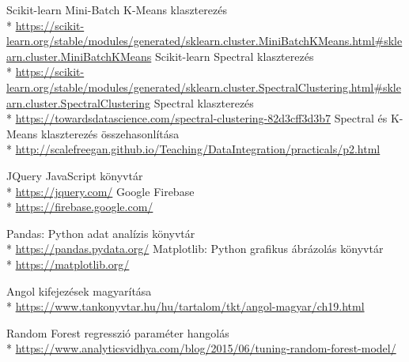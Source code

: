 \begin{thebibliography}{x}
 Scikit-learn Mini-Batch K-Means klaszterezés\\*
\url{https://scikit-learn.org/stable/modules/generated/sklearn.cluster.MiniBatchKMeans.html\#sklearn.cluster.MiniBatchKMeans}
 Scikit-learn Spectral klaszterezés\\*
\url{https://scikit-learn.org/stable/modules/generated/sklearn.cluster.SpectralClustering.html\#sklearn.cluster.SpectralClustering}
 Spectral klaszterezés\\*
\url{https://towardsdatascience.com/spectral-clustering-82d3cff3d3b7}
 Spectral és K-Means klaszterezés összehasonlítása\\*
\url{http://scalefreegan.github.io/Teaching/DataIntegration/practicals/p2.html}
	
 JQuery	JavaScript könyvtár\\* 
\url{https://jquery.com/}
 Google Firebase\\*	 
\url{https://firebase.google.com/}
	
 Pandas: Python adat analízis könyvtár\\* 
\url{https://pandas.pydata.org/}
 Matplotlib: Python grafikus ábrázolás könyvtár\\*
\url{https://matplotlib.org/}



 Angol kifejezések magyarítása\\* \url{https://www.tankonyvtar.hu/hu/tartalom/tkt/angol-magyar/ch19.html}


 Random Forest regresszió paraméter hangolás\\* \url{https://www.analyticsvidhya.com/blog/2015/06/tuning-random-forest-model/}



\iffalse
\bibitem{citekey} forrás megjelölés
\bibitem{Hohmeyer} M. E. Hohmeyer, B. A. Barsky: Rational continuity: parametric, geometric and Frenet frame
continuity of rational curves, {\em ACM Transactions on Graphics}, \textbf{8} (1989), 335--359.
\bibitem{TeX_Catalogue} \TeX\ Catalogue, {\ttfamily www.ctan.org/tex-archive/help/Catalogue/catalogue.html} 
\fi
\end{thebibliography}